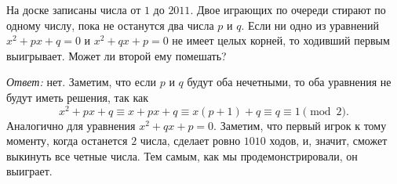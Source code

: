 На доске записаны числа от $1$ до $2011$.
Двое играющих по очереди стирают по одному числу, пока не останутся два числа
$p$ и $q$.
Если ни одно из уравнений $x^2 + p x + q = 0$ и $x^2 + q x + p = 0$ не имеет
целых корней, то ходивший первым выигрывает.
Может ли второй ему помешать?

\solution
\emph{Ответ:} нет.
Заметим, что если $p$ и $q$ будут оба нечетными, то оба уравнения не будут
иметь решения, так как
\[
   x^2 + p x + q
\equiv
   x + p x + q
\equiv
   x (p + 1) + q
\equiv
   q
\equiv
   1
\pmod{2}
.\]
Аналогично для уравнения $x^2 + q x + p = 0$.
Заметим, что первый игрок к тому моменту, когда останется $2$ числа, сделает
ровно $1010$ ходов, и, значит, сможет выкинуть все четные числа.
Тем самым, как мы продемонстрировали, он выиграет.

